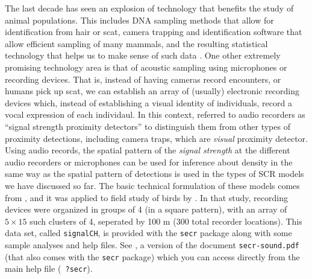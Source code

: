The last decade has seen an explosion of technology that benefits the
study of animal populations. This includes DNA sampling methods that
allow for identification from hair or scat, camera trapping and
identification software that allow efficient sampling of many
mammals, and the resulting statistical technology that helps us to
make sense of such data \citep{borchers_efford:2008,
  royle_young:2008,efford_etal:2009ecol, gopalaswamy_etal:2012ecol,
  sollmann_etal:2012ecol, chandler_royle:2012}.  One other extremely
promising technology area is that of acoustic sampling using
microphones or recording devices.  That is, instead of having cameras
record encounters, or humans pick up scat, we can establish an array of
(usually) electronic recording devices which, instead of establishing
a visual identity of individuals, record a vocal expression of
each individaul.  In this context, \citet{efford_etal:2009ecol}
referred to audio recorders as ``signal strength proximity detectors''
to distinguish them from other types of proximity detections,
including camera traps, which are {\it visual} proximity detector.
Using audio records, the spatial pattern of the {\it signal strength}
at the different audio recorders or microphones can be used for inference about density
\citep{dawson_efford:2009,efford_etal:2009ecol} in the same way as the
spatial pattern of detections is used in the types of SCR models we
have discussed so far.
The basic technical formulation of these
models comes from \citet{efford_etal:2009ecol}, and it was applied to
field study of birds by \citet{dawson_efford:2009}. In that study,
recording devices were organized in groups of 4 (in a square pattern),
with an array of $5 \times 15$ such clusters of 4, seperated by 100 m
(300 total recorder locations).  This data set,
called \verb+signalCH+, %
is provided with the
\mbox{\tt secr} package along with some sample analyses and help
files.
See \citet{efford_dawson:2010}, a version of the document
\mbox{\tt secr-sound.pdf} (that also comes with the \mbox{\tt secr} package)
which you can access directly from the main help file (\mbox{\tt
  ?secr}).

